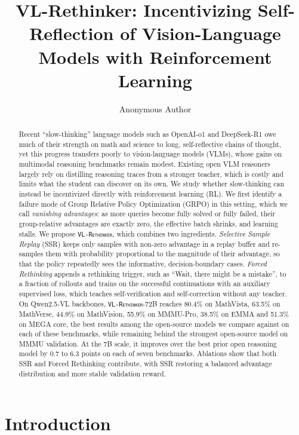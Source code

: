 \documentclass{article}
\title{VL-Rethinker: Incentivizing Self-Reflection of Vision-Language Models with Reinforcement Learning}
\author{Anonymous Author}
\newcommand{\model}{\texttt{\textsc{VL-Rethinker}}\xspace}
\begin{document}
\maketitle

\begin{abstract}
Recent ``slow-thinking'' language models such as OpenAI-o1 and DeepSeek-R1 owe much of their strength on math and science to long, self-reflective chains of thought, yet this progress transfers poorly to vision-language models (VLMs), whose gains on multimodal reasoning benchmarks remain modest. Existing open VLM reasoners largely rely on distilling reasoning traces from a stronger teacher, which is costly and limits what the student can discover on its own. We study whether slow-thinking can instead be incentivized directly with reinforcement learning (RL). We first identify a failure mode of Group Relative Policy Optimization (GRPO) in this setting, which we call \emph{vanishing advantages}: as more queries become fully solved or fully failed, their group-relative advantages are exactly zero, the effective batch shrinks, and learning stalls. We propose \model, which combines two ingredients. \emph{Selective Sample Replay} (SSR) keeps only samples with non-zero advantage in a replay buffer and re-samples them with probability proportional to the magnitude of their advantage, so that the policy repeatedly sees the informative, decision-boundary cases. \emph{Forced Rethinking} appends a rethinking trigger, such as ``Wait, there might be a mistake'', to a fraction of rollouts and trains on the successful continuations with an auxiliary supervised loss, which teaches self-verification and self-correction without any teacher. On Qwen2.5-VL backbones, \model-72B reaches 80.4\% on MathVista, 63.5\% on MathVerse, 44.9\% on MathVision, 55.9\% on MMMU-Pro, 38.5\% on EMMA and 51.3\% on MEGA core, the best results among the open-source models we compare against on each of these benchmarks, while remaining behind the strongest open-source model on MMMU validation. At the 7B scale, it improves over the best prior open reasoning model by 0.7 to 6.3 points on each of seven benchmarks. Ablations show that both SSR and Forced Rethinking contribute, with SSR restoring a balanced advantage distribution and more stable validation reward.
\end{abstract}

\section{Introduction}
\end{document}
